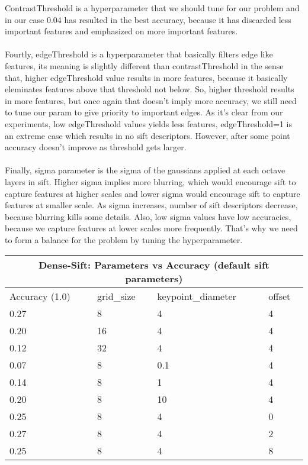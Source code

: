 \documentclass[12pt]{article}
\begin{document}
\begin{center}
        ContrastThreshold is a hyperparameter that we should tune for our problem and in our case 0.04 has resulted in the best accuracy, because it has discarded less important features and emphasized on more important features.
        \\~\\
        Fourtly, edgeThreshold is a hyperparameter that basically filters edge like features, its meaning is slightly different than contrastThreshold in the sense that, higher edgeThreshold value results in more features, because it basically eleminates features above that threshold not below.
        So, higher threshold results in more features, but once again that doesn't imply more accuracy, we still need to tune our param to give priority to important edges.
        As it's clear from our experiments, low edgeThreshold values yields less features, edgeThreshold=1 is an extreme case which results in no sift descriptors. 
        However, after some point accuracy doesn't improve as threshold gets larger.
        \\~\\
        Finally, sigma parameter is the sigma of the gaussians applied at each octave layers in sift.
        Higher sigma implies more blurring, which would encourage sift to capture features at higher scales
        and lower sigma would encourage sift to capture features at smaller scale. 
        As sigma increases, number of sift descriptors decrease, because blurring kills some details.
        Also, low sigma values have low accuracies, because we capture features at lower scales more frequently.
        That's why we need to form a balance for the problem by tuning the hyperparameter.
       
        \vspace*{0.5cm}
        \begin{tabular}{ |p{1.5cm}||p{3cm}|p{3cm}|p{3cm}| }
            \hline
            \multicolumn{4}{|c|}{Dense-Sift: Parameters vs Accuracy (default sift parameters)} \\
            \hline
            Accuracy (1.0) & grid\_size & keypoint\_diameter & offset \\
            \hline
            0.27 & 8 & 4 & 4 \\ %
            \hline
            \hline
            0.20 & 16 & 4 & 4 \\ %
            0.12 & 32 & 4 & 4 \\ %
            \hline
            \hline
            0.07 & 8 & 0.1 & 4 \\ 
            0.14 & 8 & 1 & 4 \\ 
            0.20 & 8 & 10 & 4 \\ 
            \hline
            \hline
            0.25 & 8 & 4 & 0 \\ 
            0.27 & 8 & 4 & 2 \\ 
            0.25 & 8 & 4 & 8 \\ 
            \hline
        \end{tabular}
        

\end{center}
\end{document}
